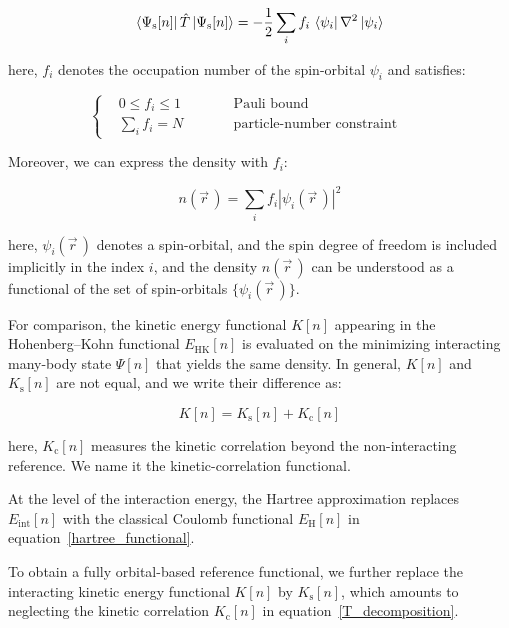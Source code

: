 \begin{equation}
    \bra{\Psi_\mathrm{s}[n]}\hat{T}\ket{\Psi_\mathrm{s}[n]}
    = -\frac{1}{2}\sum_i f_i\,\bra{\psi_i}\nabla^2\ket{\psi_i} 
\label{Ts_orbital_sum}
\end{equation}

here, $f_i$ denotes the occupation number of the spin-orbital $\psi_i$ and satisfies:

\begin{equation}
\left\{
\begin{aligned}
    &0\le f_i\le 1              &&\qquad  \text{Pauli bound} \\
    &\textstyle{\sum_i}f_i = N  &&\qquad  \text{particle-number constraint}
\end{aligned}
\right.
\qquad
\label{occupation_constraints}
\end{equation}

Moreover, we can express the density with $f_i$:

\begin{equation}
    n(\vec{r}\,)=\sum_i f_i |\psi_i(\vec{r}\,)|^2
\label{density_with_occupation_number}
\end{equation}

here, $\psi_i(\vec{r}\,)$ denotes a spin-orbital, and the spin degree of freedom is included implicitly in the index $i$,
and the density $n(\vec{r}\,)$ can be understood as a functional of the set of spin-orbitals $\{\psi_i(\vec{r}\,)\}$.

For comparison, the kinetic energy functional $K[n]$ appearing in the Hohenberg--Kohn functional $E_\mathrm{HK}[n]$ is evaluated on the minimizing interacting many-body state $\Psi[n]$ that yields the same density.
In general, $K[n]$ and $K_\mathrm{s}[n]$ are not equal, and we write their difference as:

\begin{equation}
    K[n]=K_\mathrm{s}[n]+K_\mathrm{c}[n]
\label{T_decomposition}
\end{equation}

here, $K_\mathrm{c}[n]$ measures the kinetic correlation beyond the non-interacting reference.
We name it the kinetic-correlation functional.

At the level of the interaction energy, the Hartree approximation replaces $E_\mathrm{int}[n]$ with the classical Coulomb functional $E_\mathrm{H}[n]$ in equation~\eqref{hartree_functional}.

To obtain a fully orbital-based reference functional,
we further replace the interacting kinetic energy functional $K[n]$ by $K_\mathrm{s}[n]$,
which amounts to neglecting the kinetic correlation $K_\mathrm{c}[n]$ in equation~\eqref{T_decomposition}.

